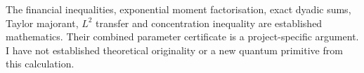 The financial inequalities, exponential moment factorisation, exact dyadic
sums, Taylor majorant, $L^2$ transfer and concentration inequality are
established mathematics. Their combined parameter certificate is a
project-specific argument. I have not established theoretical originality
or a new quantum primitive from this calculation.
